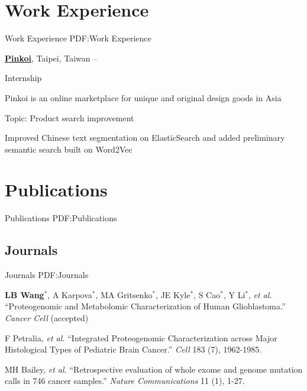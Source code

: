 \documentclass[a4paper,12pt,oneside]{article}
\begin{document}
\begin{body}

\section{Work Experience}
{Work Experience}
{PDF:Work Experience}

\href{http://pinkoi.com}
{\textbf{Pinkoi}},
Taipei, Taiwan
\hfill
{} --
\par
Internship
\begin{detail}
    \begin{detailitem}
    \item Pinkoi is an online marketplace for unique and original design goods in Asia
    \item Topic: Product search improvement
    \item Improved Chinese text segmentation on ElasticSearch and added
        preliminary semantic search built on Word2Vec
    \end{detailitem}
\end{detail}



\section{Publications}
{Publications}
{PDF:Publications}

\subsection{Journals}
{Journals}
{PDF:Journals}

\begin{publication}[series=pub, widest*=100]
    \item
        \textbf{LB Wang}$^*$, A Karpova$^*$, MA Gritsenko$^*$, JE Kyle$^*$, S Cao$^*$, Y Li$^*$, \textit{et al.}
        ``Proteogenomic and Metabolomic Characterization of Human Glioblastoma.''
        \textit{Cancer Cell}
        (accepted)

    \item
        F Petralia, \textit{et al.}
        ``Integrated Proteogenomic Characterization across Major Histological Types of Pediatric Brain Cancer.''
        \textit{Cell} 183 (7), 1962-1985.

    \item
        MH Bailey, \textit{et al.}
        ``Retrospective evaluation of whole exome and genome mutation calls in 746 cancer samples.''
        \textit{Nature Communications} 11 (1), 1-27.


\end{publication}
\end{body}
\end{document}
